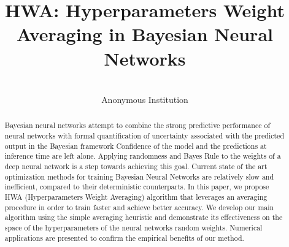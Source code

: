 \documentclass[tablecaption=bottom,wcp]{jmlr} %
\title[Hyperparameters Weight Averaging in BNNs]{HWA: Hyperparameters Weight Averaging in Bayesian Neural Networks}
\author{\Name{Anonymous Authors}\\
  \addr Anonymous Institution}
\begin{document}
\maketitle


\begin{abstract}
Bayesian neural networks attempt to combine the strong predictive performance of neural networks with formal quantification of uncertainty associated with the predicted output in the Bayesian framework
Confidence of the model and the predictions at inference time are left alone. Applying randomness and Bayes Rule to the weights of a deep neural network is a step towards achieving this goal. Current state of the art optimization methods for training Bayesian Neural Networks are relatively slow and inefficient, compared to their deterministic counterparts. In this paper, we propose \textsc{HWA} (Hyperparameters Weight Averaging) algorithm that leverages an averaging procedure in order to train faster and achieve better accuracy. We develop our main algorithm using the simple averaging heuristic and demonstrate its effectiveness on the space of the hyperparameters of the neural networks random weights. Numerical applications are presented to confirm the empirical benefits of our method.
\end{abstract}
\end{document}
